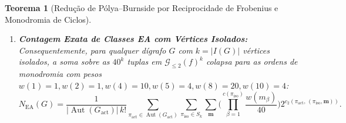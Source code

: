 \documentclass[11pt,a4paper]{article}
\newtheorem{theorem}{Teorema}[section]
\theoremstyle{definition}
\theoremstyle{remark}
\newcommand{\Aut}{\operatorname{Aut}}
\begin{document}
\begin{theorem}[Redução de Pólya--Burnside por Reciprocidade de Frobenius e Monodromia de Ciclos]
\begin{enumerate}
\begin{equation}
  \end{equation}
  onde as funções universais $\phi_{\mathrm{intra}}$ e $\phi_{\mathrm{inter}}$ são dadas analiticamente por:
  \begin{equation}\label{eq:phi_intra}
    \phi_{\mathrm{intra}}(l, m) = \begin{cases}
      32l & \text{se } m = 1 \text{ e } l \text{ é par},\\
      32l - 4 & \text{se } m = 1 \text{ e } l \text{ é ímpar},\\
      32l / m & \text{se } m \in \{2, 4, 8\},\\
      40l / m & \text{se } m \in \{5, 10\},
    \end{cases}
  \end{equation}
  e, decompondo cada par $(l, m)$ na quadrupla $(n, A, B, s)$ dada por $(8/m, (lm)_2, (lm)_{2'}, 1)$ se $m \in \{1,2,4,8\}$ e $(10/m, (lm/5)_2, l_{2'}, 5)$ se $m \in \{5,10\}$ (onde $x_2 = 2^{v_2(x)}$ e $x_{2'} = x/x_2$),
  \begin{equation}\label{eq:phi_inter}
    \phi_{\mathrm{inter}}(l_1, m_1; l_2, m_2) = n_1 n_2 \min(A_1, A_2)\, \Delta(B_1, s_1; B_2, s_2),
  \end{equation}
  onde $\Delta(B_1,1; B_2,1) = \gcd(B_1,B_2)$, $\Delta(B_1,5; B_2,1) = \gcd(5B_1,B_2) - \gcd(B_1,B_2)$, $\Delta(B_1,1; B_2,5) = \gcd(B_1,5B_2) - \gcd(B_1,B_2)$, e $\Delta(B_1,5; B_2,5) = \gcd(5B_1,5B_2) - \gcd(B_1,5B_2) - \gcd(5B_1,B_2) + \gcd(B_1,B_2)$.
  \item \textbf{Contagem Exata de Classes EA com Vértices Isolados:} Consequentemente, para qualquer dígrafo $G$ com $k = |I(G)|$ vértices isolados, a soma sobre as $40^k$ tuplas em $\mathcal{G}_{\le 2}(f)^k$ colapsa para as ordens de monodromia com pesos $w(1)=1, w(2)=1, w(4)=10, w(5)=4, w(8)=20, w(10)=4$:
  \begin{equation}\label{eq:burnside_iso}
    \textstyle N_{\mathrm{EA}}(G) = \frac{1}{|\Aut(G_{\mathrm{act}})|\,k!} \sum_{\pi_{\mathrm{act}} \in \Aut(G_{\mathrm{act}})} \sum_{\pi_{\mathrm{iso}} \in S_k} \sum_{\mathbf{m}} \Big(\prod_{\beta=1}^{c(\pi_{\mathrm{iso}})} \frac{w(m_\beta)}{40}\Big) 2^{c_2(\pi_{\mathrm{act}},\, (\pi_{\mathrm{iso}}, \mathbf{m}))}.
  \end{equation}
\end{enumerate}
\end{theorem}
\end{document}
